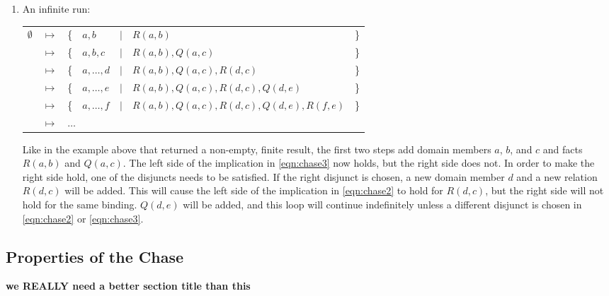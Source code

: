 \begin{enumerate}
		\item An infinite run:

			\begin{tabular}{lllllll}
				$\emptyset$ & $\mapsto$ & \{ & $a,b$        & $|$ & $R(a,b)$                                 & \} \\
				{}          & $\mapsto$ & \{ & $a,b,c$      & $|$ & $R(a,b), Q(a,c)$                         & \} \\
				{}          & $\mapsto$ & \{ & $a,\ldots,d$ & $|$ & $R(a,b), Q(a,c), R(d,c)$                 & \} \\
				{}          & $\mapsto$ & \{ & $a,\ldots,e$ & $|$ & $R(a,b), Q(a,c), R(d,c), Q(d,e)$         & \} \\
				{}          & $\mapsto$ & \{ & $a,\ldots,f$ & $|$ & $R(a,b), Q(a,c), R(d,c), Q(d,e), R(f,e)$ & \} \\
				{}          & $\mapsto$ & \multicolumn{5}{l}{ $\ldots$ }
			\end{tabular}

			Like in the example above that returned a non-empty, finite result,
			the first two steps add domain members $a$, $b$, and $c$ and facts
			$R(a,b)$ and $Q(a,c)$. The left side of the implication in
			\eqref{eqn:chase3} now holds, but the right side does not. In order
			to make the right side hold, one of the disjuncts needs to be
			satisfied. If the right disjunct is chosen, a new domain member $d$
			and a new relation $R(d,c)$ will be added. This will cause the left
			side of the implication in \eqref{eqn:chase2} to hold for $R(d,c)$,
			but the right side will not hold for the same binding. $Q(d,e)$
			will be added, and this loop will continue indefinitely unless a
			different disjunct is chosen in \eqref{eqn:chase2} or
			\eqref{eqn:chase3}.

		\end{enumerate}

	\subsection{Properties of the Chase}

		\textbf{we REALLY need a better section title than this}


